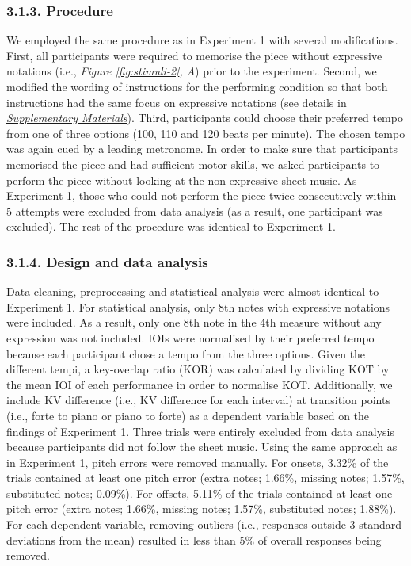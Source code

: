 \documentclass[
  english,
  man,floatsintext]{apa6}
\begin{document}
\hypertarget{procedure-2}{%
\subsubsection{3.1.3. Procedure}\label{procedure-2}}

We employed the same procedure as in Experiment 1 with several modifications. First, all participants were required to memorise the piece without expressive notations (i.e., \emph{Figure \ref{fig:stimuli-2}, A}) prior to the experiment. Second, we modified the wording of instructions for the performing condition so that both instructions had the same focus on expressive notations (see details in \emph{\protect\hyperlink{supplemental}{Supplementary Materials}}). Third, participants could choose their preferred tempo from one of three options (100, 110 and 120 beats per minute). The chosen tempo was again cued by a leading metronome. In order to make sure that participants memorised the piece and had sufficient motor skills, we asked participants to perform the piece without looking at the non-expressive sheet music. As Experiment 1, those who could not perform the piece twice consecutively within 5 attempts were excluded from data analysis (as a result, one participant was excluded). The rest of the procedure was identical to Experiment 1.

\hypertarget{design-and-data-analysis}{%
\subsubsection{3.1.4. Design and data analysis}\label{design-and-data-analysis}}

Data cleaning, preprocessing and statistical analysis were almost identical to Experiment 1. For statistical analysis, only 8th notes with expressive notations were included. As a result, only one 8th note in the 4th measure without any expression was not included. IOIs were normalised by their preferred tempo because each participant chose a tempo from the three options. Given the different tempi, a key-overlap ratio (KOR) was calculated by dividing KOT by the mean IOI of each performance in order to normalise KOT. Additionally, we include KV difference (i.e., KV difference for each interval) at transition points (i.e., forte to piano or piano to forte) as a dependent variable based on the findings of Experiment 1. Three trials were entirely excluded from data analysis because participants did not follow the sheet music. Using the same approach as in Experiment 1, pitch errors were removed manually. For onsets, 3.32\% of the trials contained at least one pitch error (extra notes; 1.66\%, missing notes; 1.57\%, substituted notes; 0.09\%). For offsets, 5.11\% of the trials contained at least one pitch error (extra notes; 1.66\%, missing notes; 1.57\%, substituted notes; 1.88\%). For each dependent variable, removing outliers (i.e., responses outside 3 standard deviations from the mean) resulted in less than 5\% of overall responses being removed.
\end{document}
